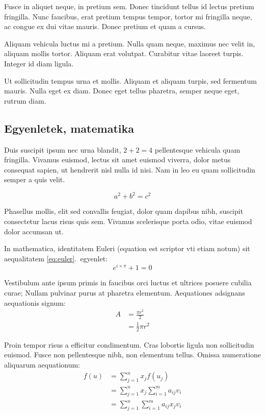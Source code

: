 Fusce in aliquet neque, in pretium sem. Donec tincidunt tellus id lectus pretium fringilla. Nunc faucibus, erat pretium tempus tempor, tortor mi fringilla neque, ac congue ex dui vitae mauris. Donec pretium et quam a cursus.

\begin{note}
Aliquam vehicula luctus mi a pretium. Nulla quam neque, maximus nec velit in, aliquam mollis tortor. Aliquam erat volutpat. Curabitur vitae laoreet turpis. Integer id diam ligula.
\end{note}

Ut sollicitudin tempus urna et mollis. Aliquam et aliquam turpis, sed fermentum mauris. Nulla eget ex diam. Donec eget tellus pharetra, semper neque eget, rutrum diam.

\subsection{Egyenletek, matematika}

Duis suscipit ipsum nec urna blandit, $2 + 2 = 4$ pellentesque vehicula quam fringilla. Vivamus euismod, lectus sit amet euismod viverra, dolor metus consequat sapien, ut hendrerit nisl nulla id nisi. Nam in leo eu quam sollicitudin semper a quis velit.

$$a^2 + b^2 = c^2$$

Phasellus mollis, elit sed convallis feugiat, dolor quam dapibus nibh, suscipit consectetur lacus risus quis sem. Vivamus scelerisque porta odio, vitae euismod dolor accumsan ut.

In mathematica, identitatem Euleri (equation est scriptor vti etiam notum) sit aequalitatem \ref{eq:euler}.~egyenlet:
\begin{equation}\label{eq:euler}
e^{i \times \pi} + 1 = 0
\end{equation}

Vestibulum ante ipsum primis in faucibus orci luctus et ultrices posuere cubilia curae; Nullam pulvinar purus at pharetra elementum.
Aequationes adsignans aequationis signum:
\begin{align}
	A & = \frac{\pi r^2}{2} \\
	  & = \frac{1}{2} \pi r^2
\end{align}

Proin tempor risus a efficitur condimentum. Cras lobortis ligula non sollicitudin euismod. Fusce non pellentesque nibh, non elementum tellus.
Omissa numeratione aliquarum aequationum:
\begin{align}
	f(u) & =\sum_{j=1}^{n} x_jf(u_j) \nonumber \\
	     & =\sum_{j=1}^{n} x_j \sum_{i=1}^{m} a_{ij}v_i \nonumber \\
	     & =\sum_{j=1}^{n} \sum_{i=1}^{m} a_{ij}x_jv_i
\end{align}

